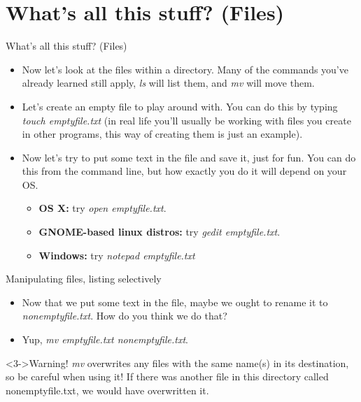 \documentclass{beamer}
\begin{document}
\section{What's all this stuff? (Files)}
\begin{frame}{What's all this stuff? (Files)}
\begin{itemize}
    \item<1-> Now let's look at the files within a directory. Many of the commands you've already learned still apply, \emph{ls} will list them, and \emph{mv} will move them.
    \item<2-> Let's create an empty file to play around with. You can do this by typing \emph{touch emptyfile.txt} (in real life you'll usually be working with files you create in other programs, this way of creating them is just an example). 
    \item<3-> Now let's try to put some text in the file and save it, just for fun. You can do this from the command line, but how exactly you do it will depend on your OS. 
    \begin{itemize}
	\item \textbf{OS X:} try \emph{open emptyfile.txt}. 
	\item \textbf{GNOME-based linux distros:} try \emph{gedit emptyfile.txt}. 
	\item \textbf{Windows:} try \emph{notepad emptyfile.txt}
    \end{itemize}
\end{itemize}
\end{frame}

\begin{frame}{Manipulating files, listing selectively}
\begin{itemize}
    \item<1-> Now that we put some text in the file, maybe we ought to rename it to \textit{nonemptyfile.txt}. How do you think we do that?
    \item<2-> Yup, \emph{mv emptyfile.txt nonemptyfile.txt}. 
    
\end{itemize}
\begin{alertblock}<3->{Warning!}
\emph{mv} overwrites any files with the same name(s) in its destination, so be careful when using it! If there was another file in this directory called nonemptyfile.txt, we would have overwritten it.
\end{alertblock}
\end{frame}
\end{document}
